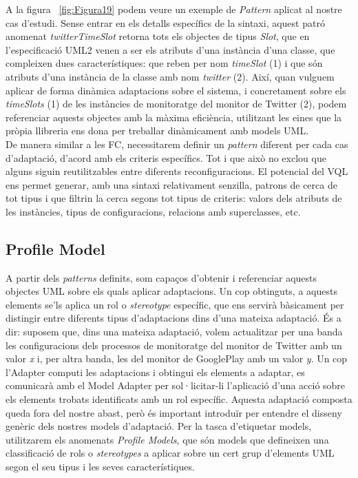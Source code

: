 A la figura ~\ref{fig:Figura19} podem veure un exemple de \textit{Pattern} aplicat al nostre cas d'estudi. Sense entrar en els detalls específics de la sintaxi, aquest patró anomenat \textit{twitterTimeSlot} retorna tots els objectes de tipus \textit{Slot}, que en l'especificació UML2 venen a ser els atributs d'una instància d'una classe, que compleixen dues característiques: que reben per nom \textit{timeSlot} (1) i que són atributs d'una instància de la classe amb nom \textit{twitter} (2). Així, quan vulguem aplicar de forma dinàmica adaptacions sobre el sistema, i concretament sobre els \textit{timeSlots} (1) de les instàncies de monitoratge del monitor de Twitter (2), podem referenciar aquests objectes amb la màxima eficiència, utilitzant les eines que la pròpia llibreria ens dona per treballar dinàmicament amb models UML.\\

De manera similar a les FC, necessitarem definir un \textit{pattern} diferent per cada cas d'adaptació, d'acord amb els criteris específics. Tot i que això no exclou que alguns siguin reutilitzables entre diferents reconfiguracions. El potencial del VQL ens permet generar, amb una sintaxi relativament senzilla, patrons de cerca de tot tipus i que filtrin la cerca segons tot tipus de criteris: valors dels atributs de les instàncies, tipus de configuracions, relacions amb superclasses, etc. 
 
\subsection{Profile Model}

A partir dels \textit{patterns} definits, som capaços d'obtenir i referenciar aquests objectes UML sobre els quals aplicar adaptacions. Un cop obtinguts, a aquests elements se'ls aplica un rol o \textit{stereotype} específic, que ens servirà bàsicament per distingir entre diferents tipus d'adaptacions dins d'una mateixa adaptació. És a dir: suposem que, dins una mateixa adaptació, volem actualitzar per una banda les configuracions dels processos de monitoratge del monitor de Twitter amb un valor \textit{x} i, per altra banda, les del monitor de GooglePlay amb un valor \textit{y}. Un cop l'Adapter computi les adaptacions i obtingui els elements a adaptar, es comunicarà amb el Model Adapter per sol·licitar-li l'aplicació d'una acció sobre els elements trobats identificats amb un rol específic. Aquesta adaptació composta queda fora del nostre abast, però és important introduïr per entendre el disseny genèric dels nostres models d'adaptació. Per la tasca d'etiquetar models, utilitzarem els anomenats \textit{Profile Models}, que són models que defineixen una classificació de rols o \textit{stereotypes} a aplicar sobre un cert grup d'elements UML segon el seu tipus i les seves característiques.\\


